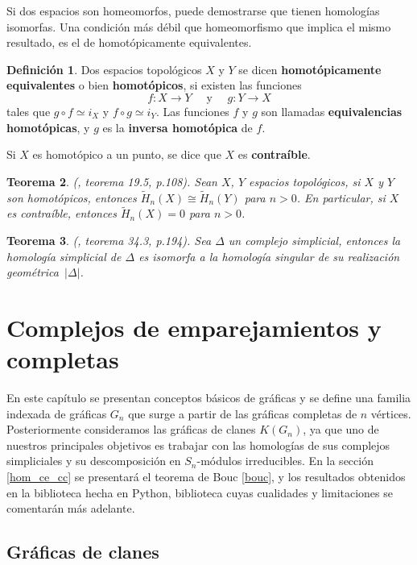 \documentclass[12pt]{book}
\newtheorem{theorem}{Teorema}[section]
\theoremstyle{definition}
\newtheorem{definition}[theorem]{Definición}
\newcounter{in}
\newcounter{ini}
\begin{document}
Si dos espacios son homeomorfos, puede demostrarse que tienen
homologías isomorfas. Una condición más débil que homeomorfismo que
implica el mismo resultado, es el de homotópicamente equivalentes.
 
\begin{definition}
  Dos espacios topológicos $X$ y $Y$ se dicen \textbf{homotópicamente
    equivalentes} o bien \textbf{homotópicos}, si existen las funciones
  $$f:X\rightarrow Y \quad \mbox{ y }\quad g:Y\rightarrow X$$
  tales que $g\circ f\simeq i_{X}$ y $f\circ g\simeq i_{Y}$. Las
  funciones $f$ y $g$ son llamadas\textbf{ equivalencias homotópicas},
  y $g$ es la \textbf{inversa homotópica} de $f$. 
\end{definition}
Si $X$ es homotópico a un punto, se dice que $X$ es
\textbf{contraíble}.

\begin{theorem}{\normalfont(\cite{munkres1984elements}, teorema 19.5,
    p.108)}.  Sean $X$, $Y$ espacios topológicos, si $X$ y $Y$ son
  homotópicos, entonces $\widetilde H_{n}(X)\cong \widetilde H_{n}(Y)$
  para $n>0$. En particular, si $X$ es contraíble, entonces
  $\widetilde H_{n}(X)=0$ para $n>0$.
  \label{esp-homotopicos-homologias-iso}
\end{theorem}

\begin{theorem}{\normalfont(\cite{munkres1984elements}, teorema 34.3, p.194)}.
  Sea $\Delta$ un complejo simplicial, entonces la homología
  simplicial de $\Delta$ es isomorfa a la homología singular de su
  realización geométrica~$|\Delta|$.
  \label{homologia-realizacion}
\end{theorem}
 
\chapter{Complejos de emparejamientos y completas}
En este capítulo se presentan conceptos básicos de gráficas y se define una familia indexada de gráficas $G_n$ que surge a partir de las gráficas completas de $n$ vértices. Posteriormente consideramos las gráficas de clanes $K(G_n)$, ya que uno de nuestros principales objetivos es trabajar con las homologías de sus complejos simpliciales y su descomposición en $S_n$-módulos irreducibles. En la sección \ref{hom_ce_cc} se presentará el teorema de Bouc \ref{bouc}, y los resultados obtenidos en la
biblioteca hecha en Python, biblioteca cuyas cualidades y limitaciones se comentarán más adelante. 
\section{Gráficas de clanes}
\label{cha:Graficas_clanes}
\end{document}
